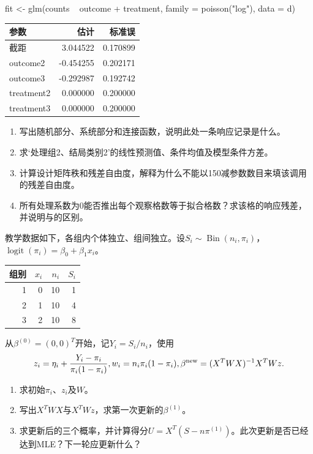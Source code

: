 \begin{rcode}
fit <- glm(counts ~ outcome + treatment,
           family = poisson("log"), data = d)
\end{rcode}
\begin{center}\begin{tabular}{lrr}\toprule
参数&估计&标准误\\\midrule
截距&3.044522&0.170899\\outcome2&-0.454255&0.202171\\outcome3&-0.292987&0.192742\\
treatment2&0.000000&0.200000\\treatment3&0.000000&0.200000\\\bottomrule\end{tabular}\end{center}
\begin{enumerate}
\item 写出随机部分、系统部分和连接函数，说明此处一条响应记录是什么。
\item 求‘处理组2、结局类别2’的线性预测值、条件均值及模型条件方差。
\item 计算设计矩阵秩和残差自由度，解释为什么不能以150减参数数目来填该调用的残差自由度。
\item 所有处理系数为0能否推出每个观察格数等于拟合格数？求该格的响应残差，并说明与的区别。
\end{enumerate}

教学数据如下，各组内个体独立、组间独立。设$S_i\sim\operatorname{Bin}(n_i,\pi_i)$，
$\operatorname{logit}(\pi_i)=\beta_0+\beta_1x_i$。
\begin{center}\begin{tabular}{rrrr}\toprule
组别&$x_i$&$n_i$&$S_i$\\\midrule1&0&10&1\\2&1&10&4\\3&2&10&8\\\bottomrule\end{tabular}\end{center}
从$\beta^{(0)}=(0,0)^T$开始，记$Y_i=S_i/n_i$，使用
\[z_i=\eta_i+\frac{Y_i-\pi_i}{\pi_i(1-\pi_i)},\quad
w_i=n_i\pi_i(1-\pi_i),\quad
\beta^{\rm new}=(X^TWX)^{-1}X^TWz.\]
\begin{enumerate}
\item 求初始$\pi_i$、$z_i$及$W$。
\item 写出$X^TWX$与$X^TWz$，求第一次更新的$\beta^{(1)}$。
\item 求更新后的三个概率，并计算得分$U=X^T(S-n\pi^{(1)})$。此次更新是否已经达到MLE？下一轮应更新什么？
\end{enumerate}

